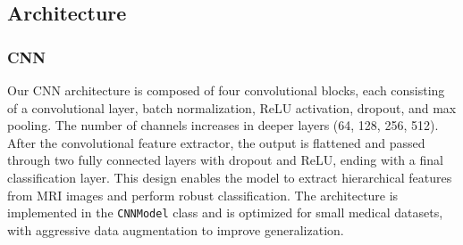 







\subsection{Architecture}

\subsubsection{CNN}
Our CNN architecture is composed of four convolutional blocks, each consisting of a convolutional layer, batch normalization, ReLU activation, dropout, and max pooling. The number of channels increases in deeper layers (64, 128, 256, 512). After the convolutional feature extractor, the output is flattened and passed through two fully connected layers with dropout and ReLU, ending with a final classification layer. This design enables the model to extract hierarchical features from MRI images and perform robust classification. The architecture is implemented in the \texttt{CNNModel} class and is optimized for small medical datasets, with aggressive data augmentation to improve generalization.

